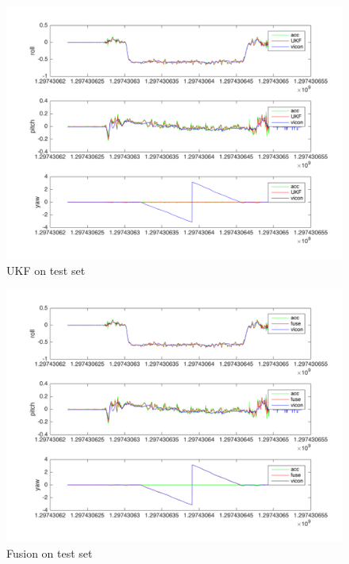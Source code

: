 \documentclass[english]{article}
\begin{document}
\begin{figure}
\centering
\includegraphics[scale=0.5]{images/UKF_100.png} 
\caption{UKF on test set}
\label{fig:ukf_test}
\end{figure}


\begin{figure}
\centering
\includegraphics[scale=0.5]{images/Fuse_100.png} 
\caption{Fusion on test set}
\label{fig:fuse_test}
\end{figure}
\end{document}
